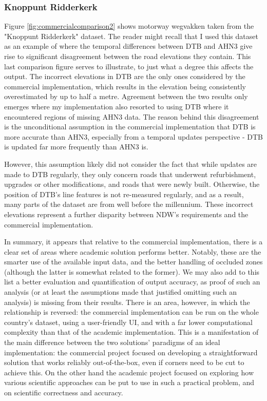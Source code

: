 \subsubsection{Knoppunt Ridderkerk}

Figure \ref{fig:commercialcomparison2} shows motorway wegvakken taken from the "Knoppunt Ridderkerk" dataset. The reader might recall that I used this dataset as an example of where the temporal differences between DTB and AHN3 give rise to significant disagreement between the road elevations they contain. This last comparison figure serves to illustrate, to just what a degree this affects the output. The incorrect elevations in DTB are the only ones considered by the commercial implementation, which results in the elevation being consistently overestimated by up to half a metre. Agreement between the two results only emerges where my implementation also resorted to using DTB where it encountered regions of missing AHN3 data. The reason behind this disagreement is the unconditional assumption in the commercial implementation that DTB is more accurate than AHN3, especially from a temporal updates perspective - DTB is updated far more frequently than AHN3 is.

However, this assumption likely did not consider the fact that while updates are made to DTB regularly, they only concern roads that underwent refurbishment, upgrades or other modifications, and roads that were newly built. Otherwise, the position of DTB's line features is not re-measured regularly, and as a result, many parts of the dataset are from well before the millennium. These incorrect elevations represent a further disparity between NDW's requirements and the commercial implementation.

In summary, it appears that relative to the commercial implementation, there is a clear set of areas where academic solution performs better. Notably, these are the smarter use of the available input data, and the better handling of occluded zones (although the latter is somewhat related to the former). We may also add to this list a better evaluation and quantification of output accuracy, as proof of such an analysis (or at least the assumptions made that justified omitting such an analysis) is missing from their results. There is an area, however, in which the relationship is reversed: the commercial implementation can be run on the whole country's dataset, using a user-friendly UI, and with a far lower computational complexity than that of the academic implementation. This is a manifestation of the main difference between the two solutions' paradigms of an ideal implementation: the commercial project focused on developing a straightforward solution that works reliably out-of-the-box, even if corners need to be cut to achieve this. On the other hand the academic project focused on exploring how various scientific approaches can be put to use in such a practical problem, and on scientific correctness and accuracy.

